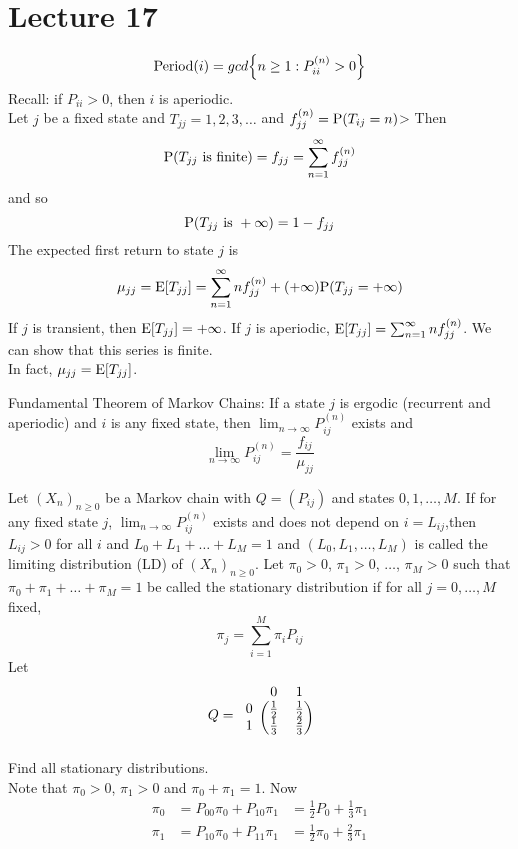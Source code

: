 \documentclass[12pt]{article}
\begin{document}
\section{Lecture 17} 
$$ \text{Period}(i) = gcd\Big\{ n \geq 1: P_{ii}^{(n)} > 0 \Big\} $$ 
Recall: if $P_{ii} > 0$, then $i$ is aperiodic. \\
Let $j$ be a fixed state and $T_{jj} = 1,2,3,\dots$ and $f_{jj}^{(n)} = \mathrm{P}( T_{ij} = n )$> Then $$ \mathrm{P}( T_{jj} \text{ is finite} ) = f_{jj} = \sum_{n=1}^\infty f_{jj}^{(n)} $$ and so $$ \mathrm{P}( T_{jj} \text{ is } +\infty ) = 1 - f_{jj} $$ 
The expected first return to state $j$ is $$ \mu_{jj} = \mathrm{E}[ T_{jj} ] = \sum_{n=1}^\infty nf_{jj}^{(n)} + (+\infty)\mathrm{P}( T_{jj} = +\infty ) $$ 
If $j$ is transient, then $\mathrm{E}[ T_{jj} ] = +\infty$. If $j$ is aperiodic, $\mathrm{E}[ T_{jj} ] = \sum_{n=1}^\infty nf_{jj}^{(n)} $. We can show that this series is finite. \\
In fact, $\mu_{jj} = \mathrm{E}[ T_{jj} ]$. 
\begin{theorem} Fundamental Theorem of Markov Chains: If a state $j$ is ergodic (recurrent and aperiodic) and $i$ is any fixed state, then $\lim_{n\to\infty} P_{ij}^{(n)}$ exists and $$ \lim_{n\to\infty} P_{ij}^{(n)} = \frac{f_{ij}}{\mu_{jj}} $$ \end{theorem} 
Let $(X_n)_{n\geq0}$ be a Markov chain with $Q = (P_{ij})$ and states $0,1,\dots,M$. If for any fixed state $j$, $\lim_{n\to\infty} P_{ij}^{(n)}$ exists and does not depend on $i = L_{ij}$,then $L_{ij} > 0$ for all $i$ and $L_0 + L_1 + \dots + L_M = 1$ and $(L_0, L_1,\dots,L_M)$ is called the limiting distribution (LD) of $(X_n)_{n\geq0}$. 
Let $\pi_0 >0$, $\pi_1 > 0$, $\dots$, $\pi_M > 0$ such that $\pi_0 + \pi_1 + \dots + \pi_M = 1$ be called the stationary distribution if for all $j = 0,\dots,M$ fixed, $$\pi_j = \sum_{i=1}^M \pi_i P_{ij} $$ 
Let $$Q = \begin{blockarray}{ccc}
&0&1 \\
\begin{block}{c(cc)}
0 & \frac{1}{2} & \frac{1}{2}   \\
1 & \frac{1}{3} & \frac{2}{3}  \\ \end{block} \end{blockarray} $$
Find all stationary distributions. \\
 Note that $\pi_0 > 0$, $\pi_1 > 0$ and $\pi_0 + \pi_1 = 1$. Now
 $$ \begin{aligned} \pi_0 &= P_{00}\pi_0 + P_{10}\pi_1 &= \frac{1}{2}P_0 + \frac{1}{3}\pi_1 \\ \pi_1 &= P_{10}\pi_0 + P_{11}\pi_1 &= \frac{1}{2}\pi_0 + \frac{2}{3}\pi_1 \end{aligned} $$ 
\end{document}
